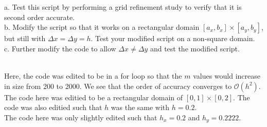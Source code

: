 a. Test this script by performing a grid refinement study to verify that it is second order accurate.\\
b. Modify the script so that it works on a rectangular domain $[a_x, b_x]\times[a_y, b_y]$, but still
with $\Delta x=\Delta y=h$. Test your modified script on a non-square domain.\\
c. Further modify the code to allow $\Delta x\neq\Delta y$ and test the modified script.\\

\begin{solution}\renewcommand{\qedsymbol}{}\ \\
    Here, the code was edited to be in a for loop so that the $m$ values would increase in size from 200
    to 2000. We see that the order of accuracy converges to $\mathcal{O}(h^2)$.\\

    The code here was editied to be a rectangular domain of $[0,1]\times[0,2]$. The code was also
    editied such that $h$ was the same with $h=0.2$.\\

    The code here was only slightly edited such that $h_x=0.2$ and $h_y=0.2222$.\\

\end{solution}

\newpage

\newpage

\newpage
